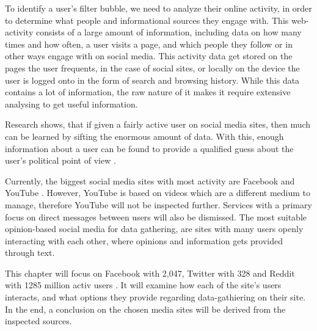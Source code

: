 
To identify a user's filter bubble, we need to analyze their online activity, in
order to determine what people and informational sources they engage with. This
web-activity consists of a large amount of information, including data on how
many times and how often, a user visits a page, and which people they follow or
in other ways engage with on social media. This activity data get stored on the
pages the user frequents, in the case of social sites, or locally on the device
the user is logged onto in the form of search and browsing history. While this
data contains a lot of information, the raw nature of it makes it require
extensive analysing to get useful information.\nl

Research shows, that if given a fairly active user on social media sites, then
much can be learned by sifting the enormous amount of data. With this, enough
information about a user can be found to provide a qualified guess about the
user's political point of view \citep{Personality}.\nl

Currently, the biggest social media sites with most activity are Facebook and
YouTube \citep{SocialMediaStats}. However, YouTube is based on videos which are
a different medium to manage, therefore YouTube will not be inspected further.
Services with a primary focus on direct messages between users will also be
dismissed. The most suitable opinion-based social media for data gathering, are
sites with many users openly interacting with each other, where opinions and
information gets provided through text.\nl

This chapter will focus on Facebook with 2,047, Twitter with 328 and Reddit with
1285 million activ users \citep{FacebookPopularity}. It will examine how each of
the site's users interacts, and what options they provide regarding data-gathiering
on their site. In the end, a conclusion on the chosen media sites will be
derived from the inspected sources.